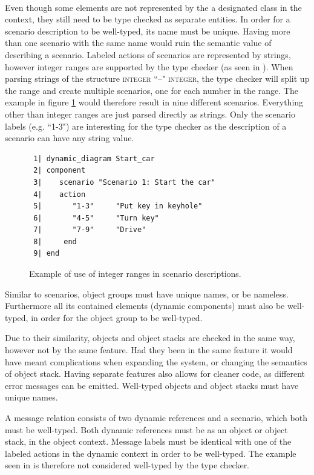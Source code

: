 \paragraph{}
Even though some elements are not represented by the a designated class in the context, they still need to be type checked as separate entities. In order for a scenario description to be well-typed, its name must be unique. Having more than one scenario with the same name would ruin the semantic value of describing a scenario. Labeled actions of scenarios are represented by strings, however integer ranges are supported by the type checker (as seen in \cite[pp. 379-380]{walden1995}). When parsing strings of the structure \textsc{integer} ``--" \textsc{integer}, the type checker will split up the range and create multiple scenarios, one for each number in the range. The example in figure \ref{fig:integer_range} would therefore result in nine different scenarios. Everything other than integer ranges are just parsed directly as strings. Only the scenario labels (e.g. ``1-3") are interesting for the type checker as the description of a scenario can have any string value.

\begin{figure}[H]
{\footnotesize
\begin{verbatim}
 1| dynamic_diagram Start_car
 2| component
 3|    scenario "Scenario 1: Start the car"
 4|    action
 5|       "1-3"     "Put key in keyhole"
 6|       "4-5"     "Turn key"
 7|       "7-9"     "Drive"
 8|     end
 9| end
\end{verbatim}
}
\caption{Example of use of integer ranges in scenario descriptions.}
\label{fig:integer_range}
\end{figure}

Similar to scenarios, object groups must have unique names, or be nameless. Furthermore all its contained elements (dynamic components) must also be well-typed, in order for the object group to be well-typed.

Due to their similarity, objects and object stacks are checked in the same way, however not by the same feature. Had they been in the same feature it would have meant complications when expanding the system, or changing the semantics of object stack. Having separate features also allows for cleaner code, as different error messages can be emitted. Well-typed objects and object stacks must have unique names.

A message relation consists of two dynamic references and a scenario, which both must be well-typed. Both dynamic references must be as an object or object stack, in the object context. Message labels must be identical with one of the labeled actions in the dynamic context in order to be well-typed. The example seen in \cite[p. 380]{walden1995} is therefore not considered well-typed by the type checker.

